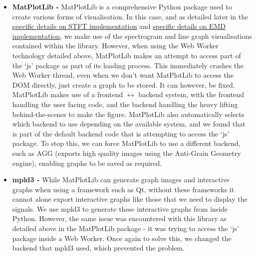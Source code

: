 \begin{itemize}
    \item {\bf MatPlotLib - } MatPlotLib is a comprehensive Python package used to create various forms of visualisation. In this case, and as detailed later in the 
    \hyperref[stftsection]{specific details on STFT implementation} and \hyperref[emdsection]{specific details on EMD implementation}, we make use of the spectrogram
    and line graph visualisations contained within the library. However, when using the Web Worker technology detailed above, MatPlotLib makes an attempt to access part of the `js' package
    as part of its loading process. This immediately crashes the Web Worker thread, even when we don't want MatPlotLib to access the DOM directly, just create a graph to be stored.
    It can however, be fixed. MatPlotLib makes use of a frontend $ \leftrightarrow $ backend system,  with the frontend handling
    the user facing code, and the backend handling the heavy lifting behind-the-scenes to make the figure. MatPlotLib also automatically selects which backend to use depending on the available
    system, and we found that is part of the default backend code that is attempting to access the `js' package. 
    To stop this, we can force MatPlotLib to use a different backend, such as AGG (exports high quality images using the Anti-Grain Geometry engine), enabling graphs to be saved as required.

    \item {\bf mpld3 - } While MatPlotLib can generate graph images and interactive graphs when using a framework such as Qt, without these frameworks it cannot alone export interactive graphs
    like those that we need to display the signals. We use mpld3 to generate these interactive graphs from inside Python. However, the same issue was encountered with this library as detailed above in the
    MatPlotLib package - it was trying to access the `js' package inside a Web Worker. Once again to solve this, we changed the backend that mpld3 used, which prevented the problem.


\end{itemize}
